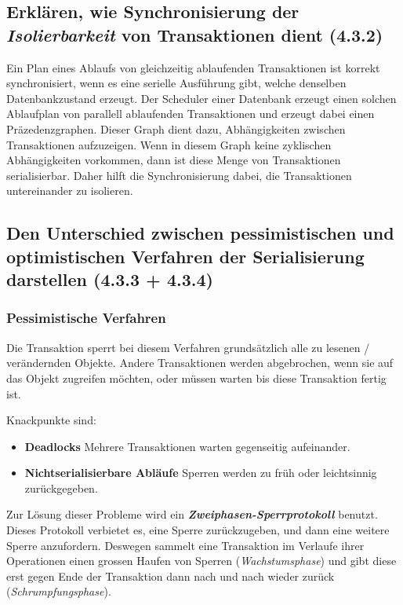 \subsection{Erklären, wie Synchronisierung der \emph{Isolierbarkeit} von Transaktionen dient (4.3.2)}
Ein Plan eines Ablaufs von gleichzeitig ablaufenden Transaktionen ist korrekt synchronisiert, wenn es eine serielle Ausführung gibt, welche denselben Datenbankzustand erzeugt. Der Scheduler einer Datenbank erzeugt einen solchen Ablaufplan von parallell ablaufenden Transaktionen und erzeugt dabei einen Präzedenzgraphen. Dieser Graph dient dazu, Abhängigkeiten zwischen Transaktionen aufzuzeigen. Wenn in diesem Graph keine zyklischen Abhängigkeiten vorkommen, dann ist diese Menge von Transaktionen serialisierbar. Daher hilft die Synchronisierung dabei, die Transaktionen untereinander zu isolieren.

\subsection{Den Unterschied zwischen pessimistischen und optimistischen Verfahren der Serialisierung darstellen (4.3.3 + 4.3.4)}
\subsubsection{Pessimistische Verfahren}
Die Transaktion sperrt bei diesem Verfahren grundsätzlich alle zu lesenen / verändernden Objekte. Andere Transaktionen werden abgebrochen, wenn sie auf das Objekt zugreifen möchten, oder müssen warten bis diese Transaktion fertig ist.

Knackpunkte sind:
\begin{itemize}
  \item \textbf{Deadlocks} 
  Mehrere Transaktionen warten gegenseitig aufeinander.
  \item \textbf{Nichtserialisierbare Abläufe}
  Sperren werden zu früh oder leichtsinnig zurückgegeben.
\end{itemize}
Zur Lösung dieser Probleme wird ein \textbf{\emph{Zweiphasen-Sperrprotokoll}} benutzt. Dieses Protokoll verbietet es, eine Sperre zurückzugeben, und dann eine weitere Sperre anzufordern. Deswegen sammelt eine Transaktion im Verlaufe ihrer Operationen einen grossen Haufen von Sperren (\emph{Wachstumsphase}) und gibt diese erst gegen Ende der Transaktion dann nach und nach wieder zurück (\emph{Schrumpfungsphase}).


